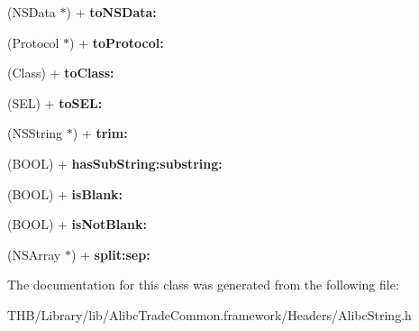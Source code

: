 \begin{DoxyCompactItemize}
(N\+S\+Data $\ast$) + {\bfseries to\+N\+S\+Data\+:}
\item 
\mbox{\label{interface_alibc_string_a9477d3c41d0d1c4b34bbd3d6a7bdef62}} 
(Protocol $\ast$) + {\bfseries to\+Protocol\+:}
\item 
\mbox{\label{interface_alibc_string_a91e4b11c18d8b3acb4af5d6d47dcb09f}} 
(Class) + {\bfseries to\+Class\+:}
\item 
\mbox{\label{interface_alibc_string_a55c920e314141e009cb19ac3acee3b7c}} 
(S\+EL) + {\bfseries to\+S\+E\+L\+:}
\item 
\mbox{\label{interface_alibc_string_a0fad0a057962014d113ff098cdba3169}} 
(N\+S\+String $\ast$) + {\bfseries trim\+:}
\item 
\mbox{\label{interface_alibc_string_a87b49e5b757caccc49f66916dc6816de}} 
(B\+O\+OL) + {\bfseries has\+Sub\+String\+:substring\+:}
\item 
\mbox{\label{interface_alibc_string_a4cdc0682790be8d1824d4ab3446e1de1}} 
(B\+O\+OL) + {\bfseries is\+Blank\+:}
\item 
\mbox{\label{interface_alibc_string_a27a126be6e60304be969510b3e3690da}} 
(B\+O\+OL) + {\bfseries is\+Not\+Blank\+:}
\item 
\mbox{\label{interface_alibc_string_a7db49d3d885be443053eca7ea7f95c9a}} 
(N\+S\+Array $\ast$) + {\bfseries split\+:sep\+:}
\end{DoxyCompactItemize}


The documentation for this class was generated from the following file\+:\begin{DoxyCompactItemize}
\item 
T\+H\+B/\+Library/lib/\+Alibc\+Trade\+Common.\+framework/\+Headers/Alibc\+String.\+h\end{DoxyCompactItemize}
